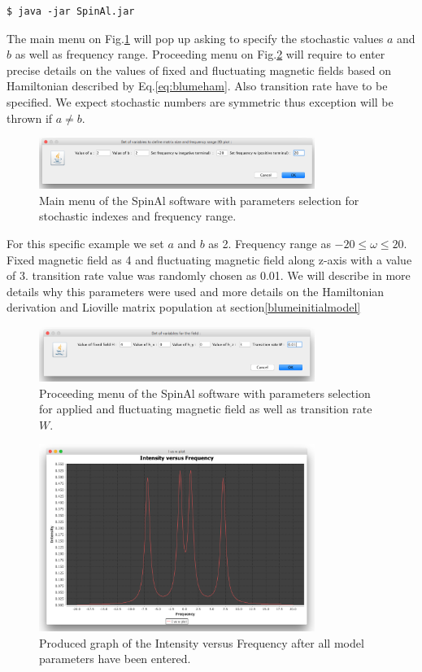 \begin{lstlisting}
$ java -jar SpinAl.jar
\end{lstlisting}
The main menu on Fig.\ref{figure:SpinAl1} will pop up asking to specify the stochastic values $a$ and $b$ as well as frequency range. Proceeding menu on Fig.\ref{figure:SpinAl2} will require to enter precise details on the values of fixed and fluctuating magnetic fields based on Hamiltonian described by Eq.\eqref{eq:blumeham}. Also transition rate have to be specified. We expect stochastic numbers are symmetric thus exception will be thrown if $a\neq b$. 
\begin{figure}[h!]
\centering
\includegraphics[width=0.8\textwidth]{figures/chap2/spinal1.png}
\caption{Main menu of the SpinAl software with parameters selection for stochastic indexes and frequency range.}
\label{figure:SpinAl1}
\end{figure}
For this specific example we set $a$ and $b$ as 2. Frequency range as $-20\leq\omega\leq 20$. Fixed magnetic field as 4 and fluctuating magnetic field along z-axis with a value of 3. transition rate value was randomly chosen as 0.01. We will describe in more details why this parameters were used and more details on the Hamiltonian derivation and Lioville matrix population at section\ref{blumeinitialmodel} 
\begin{figure}[h!]
\centering
\includegraphics[width=0.8\textwidth]{figures/chap2/spinal2.png}
\caption{Proceeding menu of the SpinAl software with parameters selection for applied and fluctuating magnetic field as well as transition rate $W$.}
\label{figure:SpinAl2}
\end{figure}
\begin{figure}[h!]
\centering
\includegraphics[width=0.8\textwidth]{figures/chap2/spinal3.png}
\caption{Produced graph of the Intensity versus Frequency after all model parameters have been entered.}
\label{figure:SpinAl3}
\end{figure}
